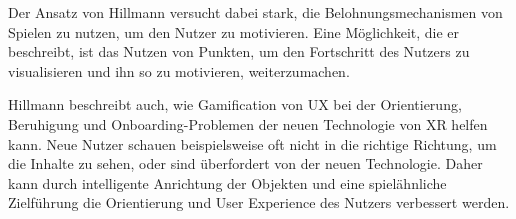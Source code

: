 Der Ansatz von Hillmann versucht dabei stark, die Belohnungsmechanismen von Spielen zu nutzen, um den Nutzer zu motivieren.
Eine Möglichkeit, die er beschreibt, ist das Nutzen von Punkten, um den Fortschritt des Nutzers zu visualisieren und ihn so zu motivieren, weiterzumachen.

Hillmann beschreibt auch, wie Gamification von UX bei der Orientierung, Beruhigung und Onboarding-Problemen der neuen Technologie von XR helfen kann.
Neue Nutzer schauen beispielsweise oft nicht in die richtige Richtung, um die Inhalte zu sehen, oder sind überfordert von der neuen Technologie.
Daher kann durch intelligente Anrichtung der Objekten und eine spielähnliche Zielführung die Orientierung und User Experience des Nutzers verbessert werden\autocite[S.67]{hillmann2021ux}.